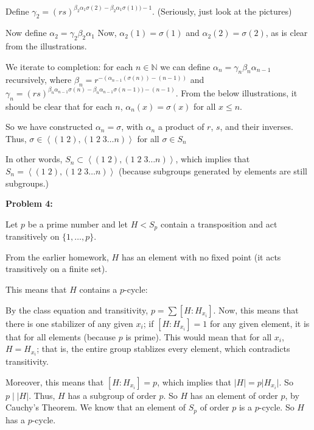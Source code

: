 \documentclass[a4paper,12pt]{article}
\newcommand{\tab}{\hspace{4mm}} %
\newcommand{\shunt}{\vspace{20mm}}
\newcommand{\absval}[1]{\lvert #1 \rvert}
\newcommand{\anbrack}[1]{\left\langle #1 \right\rangle}
\newcommand{\al}{\alpha} %
\newcommand{\be}{\beta}
\newcommand{\ga}{\gamma}
\newcommand{\N}{\mathbb{N}}
\begin{document}
\shunt %

\shunt

\tab Define $\ga_2 = (rs)^{\be_2\al_1\sigma(2)-\be_2\al_1\sigma(1)) -1}$. (Seriously, just look at the pictures)

\shunt %

\shunt

\tab Now define $\al_2 = \ga_2\be_2\al_1$ Now, $\al_2(1) = \sigma(1)$ and $\al_2(2) = \sigma(2)$, as is clear from the illustrations.

\tab We iterate to completion: for each $n \in \N$ we can define $\al_n = \ga_n\be_n\al_{n-1}$ recursively, where $\be_n = r^{-(\al_{n-1}(\sigma(n))-(n-1))}$ and $\ga_n = (rs)^{\be_n\al_{n-1}\sigma(n)-\be_n\al_{n-1}\sigma(n-1)) -(n-1)}$. From the below illustrations, it should be clear that for each $n$, $\al_n(x) = \sigma(x)$ for all $x \leq n$.

\shunt %

\shunt

\tab So we have constructed $\al_n = \sigma$, with $\al_n$ a product of $r$, $s$, and their inverses. Thus, $\sigma \in \anbrack{(1 \; 2) , (1 \; 2 \; 3 \ldots n)}$ for all $\sigma \in S_n$

In other words, $S_n \subset \anbrack{(1 \; 2) , (1 \; 2 \; 3 \ldots n)}$, which implies that $S_n = \anbrack{(1 \; 2) , (1 \; 2 \; 3 \ldots n)}$ (because subgroups generated by elements are still subgroups.)

\shunt

{\bf Problem 4:}

Let $p$ be a prime number and let $H<S_p$ contain a transposition and act transitively on $\{1,\ldots,p\}$.

From the earlier homework, $H$ has an element with no fixed point (it acts transitively on a finite set).

This means that $H$ contains a $p$-cycle:

\tab By the class equation and transitivity, $p = \sum[H:H_{x_i}]$. Now, this means that there is one stabilizer of any given $x_i$; if $[H:H_{x_i}] = 1$ for any given element, it is that for all elements (because $p$ is prime). This would mean that for all $x_i$, $H = H_{x_i}$; that is, the entire group stablizes every element, which contradicts transitivity.

\tab Moreover, this means that $[H:H_{x_i}] = p$, which implies that $\absval{H} = p \absval{H_{x_i}}$. So $p \mid \absval{H}$. Thus, $H$ has a subgroup of order $p$. So $H$ has an element of order $p$, by Cauchy's Theorem. We know that an element of $S_p$ of order $p$ is a $p$-cycle. So $H$ has a $p$-cycle.
\end{document}
